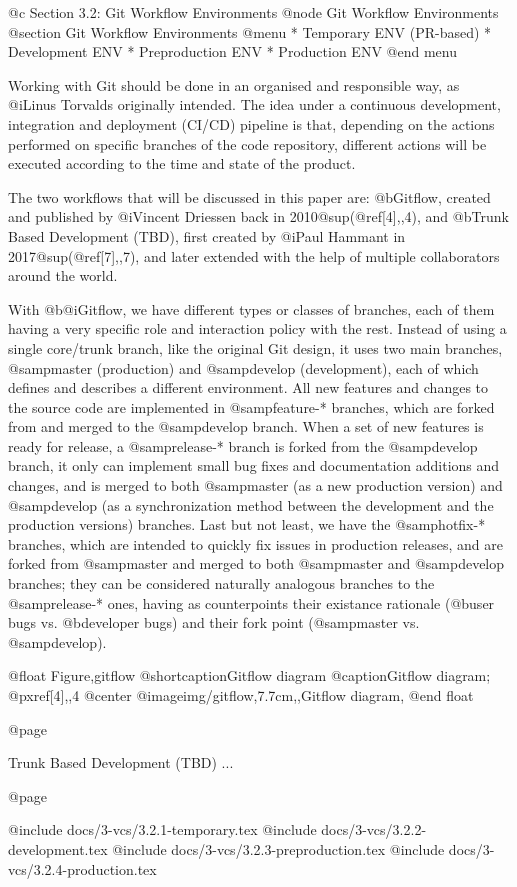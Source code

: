 @c Section 3.2: Git Workflow Environments
@node Git Workflow Environments
@section Git Workflow Environments
@menu
* Temporary ENV (PR-based)
* Development ENV
* Preproduction ENV
* Production ENV
@end menu

Working with Git should be done in an organised and responsible way, as @i{Linus Torvalds} originally intended. The idea under a continuous development, integration and deployment (CI/CD) pipeline is that, depending on the actions performed on specific branches of the code repository, different actions will be executed according to the time and state of the product.

The two workflows that will be discussed in this paper are: @b{Gitflow}, created and published by @i{Vincent Driessen} back in 2010@sup{(@ref{[4],,4})}, and @b{Trunk Based Development (TBD)}, first created by @i{Paul Hammant} in 2017@sup{(@ref{[7],,7})}, and later extended with the help of multiple collaborators around the world.

With @b{@i{Gitflow}}, we have different types or classes of branches, each of them having a very specific role and interaction policy with the rest. Instead of using a single core/trunk branch, like the original Git design, it uses two main branches, @samp{master} (production) and @samp{develop} (development), each of which defines and describes a different environment. All new features and changes to the source code are implemented in @samp{feature-*} branches, which are forked from and merged to the @samp{develop} branch. When a set of new features is ready for release, a @samp{release-*} branch is forked from the @samp{develop} branch, it only can implement small bug fixes and documentation additions and changes, and is merged to both @samp{master} (as a new production version) and @samp{develop} (as a synchronization method between the development and the production versions) branches. Last but not least, we have the @samp{hotfix-*} branches, which are intended to quickly fix issues in production releases, and are forked from @samp{master} and merged to both @samp{master} and @samp{develop} branches; they can be considered naturally analogous branches to the @samp{release-*} ones, having as counterpoints their existance rationale (@b{user bugs} vs. @b{developer bugs}) and their fork point (@samp{master} vs. @samp{develop}).

@float Figure,gitflow
@shortcaption{Gitflow diagram}
@caption{Gitflow diagram; @pxref{[4],,4}}
@center @image{img/gitflow,7.7cm,,Gitflow diagram,}
@end float

@page

Trunk Based Development (TBD) ...

@page

@include docs/3-vcs/3.2.1-temporary.tex
@include docs/3-vcs/3.2.2-development.tex
@include docs/3-vcs/3.2.3-preproduction.tex
@include docs/3-vcs/3.2.4-production.tex
